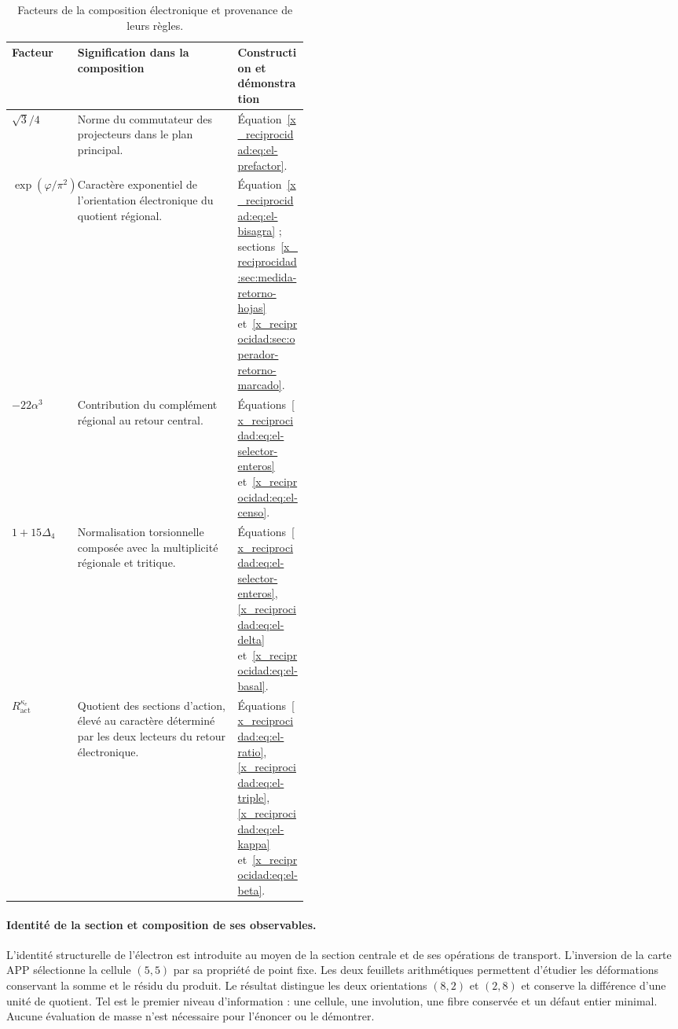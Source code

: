\begin{table}[htbp]
\centering
\small
\setlength{\tabcolsep}{4pt}
\renewcommand{\arraystretch}{1.18}
\begin{tabularx}{\linewidth}{@{}p{0.20\linewidth}Xp{0.24\linewidth}@{}}
\toprule
Facteur & Signification dans la composition & Construction et démonstration\\
\midrule
\(\sqrt3/4\)
 & Norme du commutateur des projecteurs dans le plan principal.
 & Équation~\eqref{x_reciprocidad:eq:el-prefactor}.\\
\(\exp(\varphi/\pi^2)\)
 & Caractère exponentiel de l'orientation électronique du quotient régional.
 & Équation~\eqref{x_reciprocidad:eq:el-bisagra} ; sections~\ref{x_reciprocidad:sec:medida-retorno-hojas}
   et~\ref{x_reciprocidad:sec:operador-retorno-marcado}.\\
\(-22\alpha^3\)
 & Contribution du complément régional au retour central.
 & Équations~\eqref{x_reciprocidad:eq:el-selector-enteros} et~\eqref{x_reciprocidad:eq:el-censo}.\\
\(1+15\Delta_4\)
 & Normalisation torsionnelle composée avec la multiplicité régionale
   et tritique.
 & Équations~\eqref{x_reciprocidad:eq:el-selector-enteros}, \eqref{x_reciprocidad:eq:el-delta}
   et~\eqref{x_reciprocidad:eq:el-basal}.\\
\(R_{\mathrm{act}}^{\kappa_e}\)
 & Quotient des sections d'action, élevé au caractère déterminé par les deux lecteurs du retour électronique.
 & Équations~\eqref{x_reciprocidad:eq:el-ratio}, \eqref{x_reciprocidad:eq:el-triple},
   \eqref{x_reciprocidad:eq:el-kappa} et~\eqref{x_reciprocidad:eq:el-beta}.\\
\bottomrule
\end{tabularx}
\caption{Facteurs de la composition électronique et provenance de leurs règles.}
\label{x_reciprocidad:tab:el-factores}
\end{table}


\paragraph{Identité de la section et composition de ses observables.}
\label{x_reciprocidad:el-ampl-articulacion}
L'identité structurelle de l'électron est introduite au moyen de la section
centrale et de ses opérations de transport. L'inversion de la carte APP
sélectionne la cellule $(5,5)$ par sa propriété de point fixe. Les deux feuillets
arithmétiques permettent d'étudier les déformations conservant la somme et
le résidu du produit. Le résultat distingue les deux orientations
$(8,2)$ et $(2,8)$ et conserve la différence d'une unité de quotient.
Tel est le premier niveau d'information : une cellule, une involution, une
fibre conservée et un défaut entier minimal. Aucune évaluation de masse
n'est nécessaire pour l'énoncer ou le démontrer.

